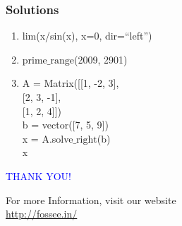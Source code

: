 \documentclass[presentation]{beamer}
\begin{document}
\begin{frame}
\frametitle{Solutions}
\label{sec-7}


\begin{enumerate}
\item lim(x/sin(x), x=0, dir=``left'')
\vspace{4pt}
\item prime$\_{\mathrm{range}}$(2009, 2901)
\vspace{4pt}
\item A = Matrix([[1, -2, 3], \\
\hspace{1.78cm}
                  [2, 3, -1], \\
\hspace{1.78cm}             
                  [1, 2, 4]]) \\
\vspace{2pt}
   b = vector([7, 5, 9])\\
\vspace{2pt}
   x = A.solve$\_{\mathrm{right}}$(b)\\
\vspace{2pt}
   x   
\end{enumerate}
\end{frame}
\begin{frame}

  \begin{block}{}
  \begin{center}
  \textcolor{blue}{\Large THANK YOU!} 
  \end{center}
  \end{block}
\begin{block}{}
  \begin{center}
    For more Information, visit our website\\
    \url{http://fossee.in/}
  \end{center}  
  \end{block}
\end{frame}
\end{document}
